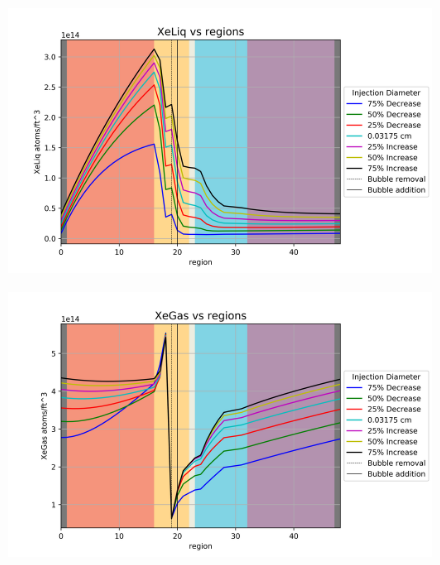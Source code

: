 \begin{figure}[p] 
\centering
\begin{minipage}{.5\textwidth}
  \centering
  \includegraphics[width=1.0\linewidth]{images/InjectedXeLiq.png}
  \label{fig:InjectedXeLiq}
\end{minipage}%
\begin{minipage}{.5\textwidth}
  \centering
  \includegraphics[width=1.0\linewidth]{images/InjectedXeGas.png}
  \label{fig:InjectedXeGas}
\end{minipage}
\end{figure}

\FloatBarrier
\newpage

